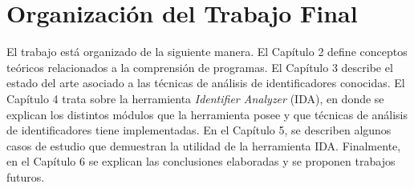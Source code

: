 
\section{Organización del Trabajo Final}

El trabajo está organizado de la siguiente manera. El Capítulo 2 define conceptos teóricos relacionados a la comprensión de programas. El Capítulo 3 describe el estado del arte asociado a las técnicas de análisis de identificadores conocidas. El Capítulo 4 trata sobre la herramienta \textit{Identifier Analyzer} (IDA), en donde se explican los distintos módulos que la herramienta posee y que técnicas de análisis de identificadores tiene implementadas. En el Capítulo 5, se describen algunos casos de estudio que demuestran la utilidad de la herramienta IDA.
Finalmente, en el Capítulo 6 se explican las conclusiones elaboradas y se proponen trabajos futuros.